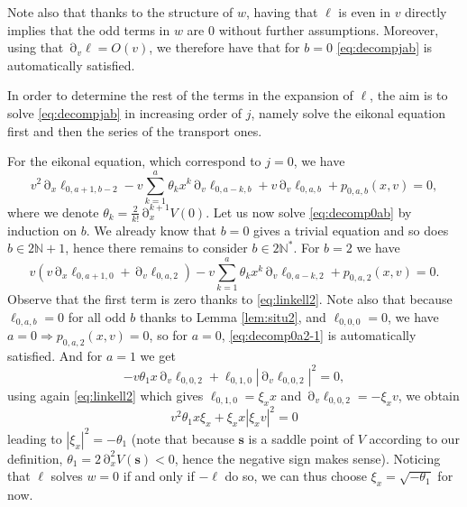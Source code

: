 \documentclass[12pt]{amsart}
\newcommand{\N}{\mathbb N}
\numberwithin{equation}{section}
\numberwithin{figure}{section}
\def\s{\mathbf{s}}
\DeclareMathOperator{\p}{\partial}
\begin{document}
Note also that thanks to the structure of $w$, having that $\ell$ is even in $v$ directly implies that the odd terms in $w$ are $0$ without further assumptions. Moreover, using that $\p_v\ell = O(v)$, we therefore have that for $b=0$ \eqref{eq:decompjab} is automatically satisfied.

In order to determine the rest of the terms in the expansion of $\ell$, the aim is to solve \eqref{eq:decompjab} in increasing order of $j$, namely solve the eikonal equation first and then the series of the transport ones.

For the eikonal equation, which correspond to $j=0$, we have
\begin{equation}\label{eq:decomp0ab}
v^2\p_x\ell_{0,a+1,b-2} - v\sum_{k=1}^a\theta_kx^k\p_v\ell_{0,a-k,b} + v\p_v\ell_{0,a,b} + p_{0,a,b}(x,v) = 0,
\end{equation}
where we denote $\theta_k = \frac{2}{k!}\p_x^{k+1}V(0)$. Let us now solve \eqref{eq:decomp0ab} by induction on $b$. We already know that $b=0$ gives a trivial equation and so does $b\in2\N+1$, hence there remains to consider $b\in2\N^*$. For $b=2$ we have
\begin{equation}\label{eq:decomp0a2-1}
v(v\p_x\ell_{0,a+1,0} + \p_v\ell_{0,a,2}) -v\sum_{k=1}^a\theta_kx^k\p_v\ell_{0,a-k,2} + p_{0,a,2}(x,v) = 0.
\end{equation}
Observe that the first term is zero thanks to \eqref{eq:linkell2}. Note also that because $\ell_{0,a,b} = 0$ for all odd $b$ thanks to Lemma \ref{lem:situ2}, and $\ell_{0,0,0} = 0$, we have $a=0\Rightarrow p_{0,a,2}(x,v)=0$, so for $a=0$, \eqref{eq:decomp0a2-1} is automatically satisfied. And for $a=1$ we get
\begin{equation*}
- v\theta_{1}x\p_v\ell_{0,0,2} + \ell_{0,1,0}|\p_v\ell_{0,0,2}|^2 = 0,
\end{equation*}
using again \eqref{eq:linkell2} which gives $\ell_{0,1,0} = \xi_x x$ and $\p_v\ell_{0,0,2} = -\xi_xv$, we obtain
\begin{equation*}
v^2\theta_{1}x\xi_x + \xi_xx|\xi_xv|^2 = 0
\end{equation*}
leading to $|\xi_x|^2 = -\theta_{1}$ (note that because $\s$ is a saddle point of $V$ according to our definition, $\theta_1 = 2\p_x^{2}V(\s)<0$, hence the negative sign makes sense). Noticing that $\ell$ solves $w=0$ if and only if $-\ell$ do so, we can thus choose $\xi_x =\sqrt{-\theta_1}$ for now.
\end{document}

